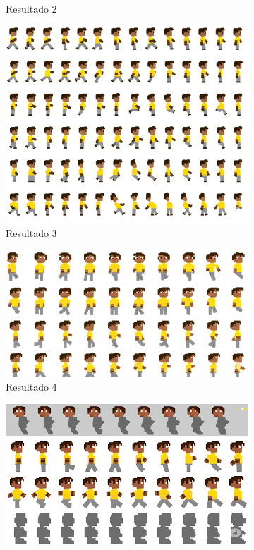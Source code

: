 \begin{figure}[htbp]
\begin{subfigure}{0.3\linewidth}
        \caption{\small Resultado 2}
        \label{fig:geminiProSheet3b}
    \end{subfigure}
    \begin{subfigure}{0.3\linewidth}
        \includegraphics[width=1\linewidth]{figs/geminiPro/chat9/1res3.PNG}
        \caption{\small Resultado 3}
        \label{fig:geminiProSheet3c}
    \end{subfigure}
    \begin{subfigure}{0.3\linewidth}
        \includegraphics[width=1\linewidth]{figs/geminiPro/chat9/1res4.PNG}
        \caption{\small Resultado 4}
        \label{fig:geminiProSheet3d}
    \end{subfigure}
    \begin{subfigure}{0.3\linewidth}
        \includegraphics[width=1\linewidth]{figs/geminiPro/chat9/1res5.PNG}

\end{subfigure}
\end{figure}
